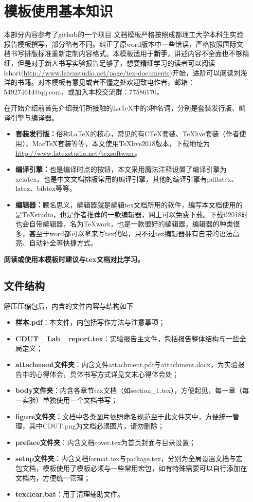 \chapter{模板使用基本知识}
本部分内容参考了github的一个项目
文档模板严格按照成都理工大学本科生实验报告模板撰写，部分略有不同。纠正了原word版本中一些错误，严格按照国际文档书写排版标准重新定制内容格式。本模板适用于\textbf{新手}，讲述内容不全面也不够精细，但是对于新人书写实验报告足够了，想要精细学习的读者可以阅读lshort(\url{http://www.latexstudio.net/page/tex-documents})开始，进阶可以阅读刘海洋的书籍。对本模板有意见或者不懂之处欢迎致电作者，邮箱：549274614@qq.com，或加入本校交流群：77586170。

在开始介绍前首先介绍我们所接触的\LaTeX 中的3种名词，分别是套装发行版、编译引擎与编译器。
\begin{itemize}
\item \textbf{套装发行版：}俗称\LaTeX 的核心，常见的有CTeX套装、TeXlive套装（作者使用）、MacTeX套装等等，本文使用TeXlive2018版本，下载地址为\url{http://www.latexstudio.net/texsoftware}。

\item \textbf{编译引擎：}也是编译时点的按钮，本文采用魔法注释设置了编译引擎为xelatex，也是中文文档排版常用的编译引擎，其他的编译引擎有pdflatex、latex、bibtex等等。
 
\item \textbf{编辑器：}顾名思义，编辑器就是编辑tex文档所用的软件，编写本文档使用的是TeXstudio，也是作者推荐的一款编辑器，网上可以免费下载。下载tl2018时也会自带编辑器，名为TeXwork，也是一款很好的编辑器，编辑器的种类很多，甚至于word都可以拿来写tex代码，只不过tex编辑器拥有自带的语法高亮、自动补全等快捷方式。
\end{itemize}

\textbf{阅读或使用本模板时建议与tex文档对比学习。}

\section{文件结构}
解压压缩包后，内含的文件内容与结构如下
\begin{itemize}
\item \textbf{样本.pdf}：本文件，内包括写作方法与注意事项；
\item \textbf{CDUT\_ Lab\_ report.tex}：实验报告主文件，包括报告整体结构与一些全局定义；
\item \textbf{attachment文件夹}：内含文件attachment.pdf与attachment.docx，为实验报告中的心得体会，具体书写方式详见文末心得体会处；
\item \textbf{body文件夹}：内含各章节tex文档（如section\_1.tex），方便起见，每一章（每一实验）单独使用一个文档书写；
\item \textbf{figure文件夹}：文档中各类图片依照命名规范至于此文件夹中，方便统一管理，其中CDUT.png为文档必须图片，请勿删除；
\item \textbf{preface文件夹}：内含文档cover.tex为首页封面与目录设置；
\item \textbf{setup文件夹}：内含文档format.tex与package.tex，分别为全局设置文档与宏包文档，模板使用了模板必须与一些常用宏包，如有特殊需要可以自行添加在文档内，方便统一管理；
\item \textbf{texclear.bat}：用于清理辅助文件。
\end{itemize}

